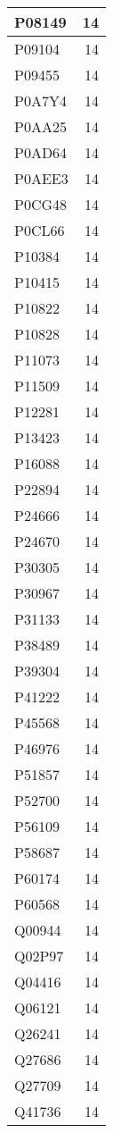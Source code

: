 \documentclass[
]{book}
\theoremstyle{definition}
\theoremstyle{definition}
\theoremstyle{definition}
\theoremstyle{definition}
\theoremstyle{remark}
\begin{document}
\begin{table}
\begin{tabular}{l|r}
\hline
P08149 & 14\\
\hline
P09104 & 14\\
\hline
P09455 & 14\\
\hline
P0A7Y4 & 14\\
\hline
P0AA25 & 14\\
\hline
P0AD64 & 14\\
\hline
P0AEE3 & 14\\
\hline
P0CG48 & 14\\
\hline
P0CL66 & 14\\
\hline
P10384 & 14\\
\hline
P10415 & 14\\
\hline
P10822 & 14\\
\hline
P10828 & 14\\
\hline
P11073 & 14\\
\hline
P11509 & 14\\
\hline
P12281 & 14\\
\hline
P13423 & 14\\
\hline
P16088 & 14\\
\hline
P22894 & 14\\
\hline
P24666 & 14\\
\hline
P24670 & 14\\
\hline
P30305 & 14\\
\hline
P30967 & 14\\
\hline
P31133 & 14\\
\hline
P38489 & 14\\
\hline
P39304 & 14\\
\hline
P41222 & 14\\
\hline
P45568 & 14\\
\hline
P46976 & 14\\
\hline
P51857 & 14\\
\hline
P52700 & 14\\
\hline
P56109 & 14\\
\hline
P58687 & 14\\
\hline
P60174 & 14\\
\hline
P60568 & 14\\
\hline
Q00944 & 14\\
\hline
Q02P97 & 14\\
\hline
Q04416 & 14\\
\hline
Q06121 & 14\\
\hline
Q26241 & 14\\
\hline
Q27686 & 14\\
\hline
Q27709 & 14\\
\hline
Q41736 & 14\\

\end{tabular}
\end{table}
\end{document}
